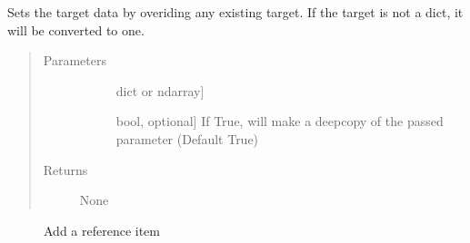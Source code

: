 \documentclass[letterpaper,10pt,english]{sphinxmanual}
\begin{document}
\begin{fulllineitems}
\label{\detokenize{generated/seg1d.Segmenter.set_target:seg1d.Segmenter.set_target}}
\sphinxAtStartPar
Sets the target data by overiding any existing target.
If the target is not a dict, it will be converted to one.
\begin{quote}\begin{description}
\item[{Parameters}] \leavevmode\begin{description}
\item[{}] \leavevmode{[}dict or ndarray{]}

\item[{}] \leavevmode{[}bool, optional{]}
\sphinxAtStartPar
If True, will make a deepcopy of the passed parameter (Default True)

\end{description}

\item[{Returns}] \leavevmode\begin{description}
\item[{None}] \leavevmode
\end{description}

\end{description}\end{quote}


\nopagebreak

\begin{description}
\item[{{\hyperref[\detokenize{generated/seg1d.Segmenter.add_reference:seg1d.Segmenter.add_reference}]{}}}] \leavevmode
\sphinxAtStartPar
Add a reference item


\end{description}
\end{fulllineitems}
\end{document}
